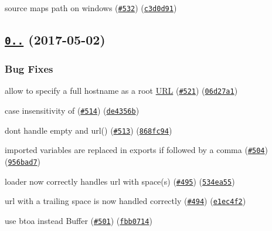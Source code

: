 \begin{DoxyItemize}
\item source maps path on {\ttfamily windows} (\href{https://github.com/webpack/css-loader/issues/532}{\tt \#532}) (\href{https://github.com/webpack/css-loader/commit/c3d0d91}{\tt c3d0d91})
\end{DoxyItemize}

\label{_0.28.1}%
 \subsection*{\href{https://github.com/webpack/css-loader/compare/v0.28.0...v0.28.1}{\tt 0..} (2017-\/05-\/02)}

\subsubsection*{Bug Fixes}


\begin{DoxyItemize}
\item allow to specify a full hostname as a root \mbox{\hyperlink{namespace_u_r_l}{U\+RL}} (\href{https://github.com/webpack/css-loader/issues/521}{\tt \#521}) (\href{https://github.com/webpack/css-loader/commit/06d27a1}{\tt 06d27a1})
\item case insensitivity of \href{https://github.com/import}{\tt } (\href{https://github.com/webpack/css-loader/issues/514}{\tt \#514}) (\href{https://github.com/webpack/css-loader/commit/de4356b}{\tt de4356b})
\item don\textquotesingle{}t handle empty \href{https://github.com/import}{\tt } and url() (\href{https://github.com/webpack/css-loader/issues/513}{\tt \#513}) (\href{https://github.com/webpack/css-loader/commit/868fc94}{\tt 868fc94})
\item imported variables are replaced in exports if followed by a comma (\href{https://github.com/webpack/css-loader/issues/504}{\tt \#504}) (\href{https://github.com/webpack/css-loader/commit/956bad7}{\tt 956bad7})
\item loader now correctly handles {\ttfamily url} with space(s) (\href{https://github.com/webpack/css-loader/issues/495}{\tt \#495}) (\href{https://github.com/webpack/css-loader/commit/534ea55}{\tt 534ea55})
\item url with a trailing space is now handled correctly (\href{https://github.com/webpack/css-loader/issues/494}{\tt \#494}) (\href{https://github.com/webpack/css-loader/commit/e1ec4f2}{\tt e1ec4f2})
\item use {\ttfamily btoa} instead {\ttfamily Buffer} (\href{https://github.com/webpack/css-loader/issues/501}{\tt \#501}) (\href{https://github.com/webpack/css-loader/commit/fbb0714}{\tt fbb0714})
\end{DoxyItemize}

